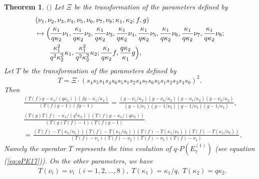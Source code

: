 \documentclass[12pt]{amsart}
\numberwithin{equation}{section}
\newtheorem{thm}[prop]{\bf Theorem}
\theoremstyle{definition}
\begin{document}
\begin{thm} $($\cite[Theorem 4.1 (i)]{TsqP}$)$ \label{thm:TsqPE7}
Let $\Xi $ be the transformation of the parameters defined by
\begin{align}
& (\nu_1 , \nu_2 , \nu_3 , \nu_4 ,\nu_5 ,\nu_6 , \nu_7 ,\nu_8 ;\kappa_1 ,\kappa_2 ; f ,g) \label{eq:E7Xi} \\
& \mapsto  \Bigl( \frac{\kappa_1  }{ q \kappa_2 } \nu _1 ,\frac{\kappa_1  }{ q \kappa_2 } \nu _2 ,\frac{\kappa_1  }{ q \kappa_2 } \nu _3 ,\frac{\kappa_1  }{ q \kappa_2 } \nu _4 ,\frac{\kappa_1  }{ q \kappa_2 } \nu _5 ,\frac{\kappa_1  }{ q \kappa_2 } \nu _6 ,\frac{\kappa_1  }{ q \kappa_2 } \nu _7 ,\frac{\kappa_1  }{ q \kappa_2 } \nu _8  ; \nonumber \\
& \qquad \frac{\kappa_1^2}{q^2 \kappa _2^2 } \kappa_1,\frac{\kappa_1^2 }{q^2 \kappa ^2_2 } \kappa _2; \frac{\kappa_1}{q \kappa _2} f , \frac{q \kappa_2 }{\kappa_1 } g \Bigr) ,\nonumber
\end{align}
Let $T$ be the transformation of the parameters defined by 
\begin{equation}
T= \Xi \cdot ( s_4 s_5 s_1 s_4 s_6 s_5 s_1 s_2 s_4 s_7 s_6 s_5 s_1 s_2 s_3 s_4 s_0  )^2 . \label{eq:E7TXis}
\end{equation}
Then 
\begin{align}
& \frac{(T(f) g -\kappa_1/(q \kappa_2 ) )(f g -\kappa_1 /\kappa_2 )}{( T(f) g-1 )(fg -1)} = \frac{ ( g -  \nu _5 / \kappa_2 ) ( g -  \nu _6 / \kappa_2 ) ( g -  \nu _7 / \kappa_2 ) ( g -  \nu _8 / \kappa_2 ) }{(g -1/ \nu _1 ) (g -1/ \nu _2 ) (g -1/ \nu _3 ) (g -1/ \nu _4 ) } , \label{eq:E7TfTg} \\
& \frac{( T(g) T(f) -\kappa_1/(q^2 \kappa_2) )( T(f) g - \kappa _1 /( q \kappa_2 ))}{(T(g)T(f) -1)(T (f) g - 1 )} \nonumber \\
& = \frac{ (T (f) - T(\kappa_1 / \nu_5 )) (T (f) - T(\kappa_1 /\nu_6 )) (T (f) - T( \kappa_1 /\nu_7 )) (T (f) - T(\kappa_1 / \nu_8 )) }{ ( T (f) - \nu_1 ) ( T (f) - \nu_2 ) ( T (f) - \nu_3 ) ( T (f) - \nu_4 )}. \nonumber
\end{align}
Namely the operator $T$ represents the time evolution of $q$-$P(E^{(1)}_7)$ (see equation (\ref{eq:qPE17})).
On the other parameters, we have
\begin{align}
& \displaystyle T(\nu _i)= \nu _i \; (i=1,2,\dots ,8) , \;  T(\kappa _1 ) =  \kappa _1  / q , \; T(\kappa _2 ) = q \kappa _2  . \label{eq:E7T} 
\end{align}
\end{thm}
\end{document}
